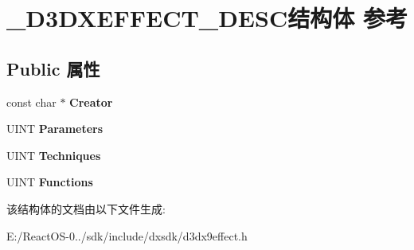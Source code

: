 \hypertarget{struct___d3_d_x_e_f_f_e_c_t___d_e_s_c}{}\section{\+\_\+\+D3\+D\+X\+E\+F\+F\+E\+C\+T\+\_\+\+D\+E\+S\+C结构体 参考}
\label{struct___d3_d_x_e_f_f_e_c_t___d_e_s_c}
\subsection*{Public 属性}
\begin{DoxyCompactItemize}
\item 
\mbox{\label{struct___d3_d_x_e_f_f_e_c_t___d_e_s_c_a890b1acd8d90b3eee95c1a004ebb8687}} 
const char $\ast$ {\bfseries Creator}
\item 
\mbox{\label{struct___d3_d_x_e_f_f_e_c_t___d_e_s_c_adc03cd8d1ce58d1599ff33fe3410d5e4}} 
U\+I\+NT {\bfseries Parameters}
\item 
\mbox{\label{struct___d3_d_x_e_f_f_e_c_t___d_e_s_c_ab59aebe9d07332db6787624f3fcfb9bb}} 
U\+I\+NT {\bfseries Techniques}
\item 
\mbox{\label{struct___d3_d_x_e_f_f_e_c_t___d_e_s_c_aefa29d5bd7e40263d686c1c1a150cbbf}} 
U\+I\+NT {\bfseries Functions}
\end{DoxyCompactItemize}


该结构体的文档由以下文件生成\+:\begin{DoxyCompactItemize}
\item 
E\+:/\+React\+O\+S-\/0../sdk/include/dxsdk/d3dx9effect.\+h\end{DoxyCompactItemize}
